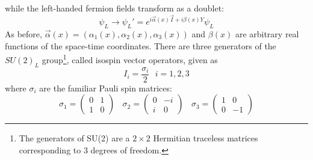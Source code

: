 while the left-handed fermion fields transform as a doublet:
\begin{equation} \label{eq:EW_doublet}
    \psi_L \rightarrow \psi_L' = e^{i\Vec{\alpha}(x)\vec{I} + i\beta(x)Y}\psi_L
\end{equation}
As before, $\Vec{\alpha}(x) = (\alpha_1(x), \alpha_2(x), \alpha_3(x))$ and $\beta(x)$ are arbitrary real functions of the space-time coordinates. There are three generators of the $SU(2)_L$ group\footnote{The generators of SU(2) are a $2 \times 2$ Hermitian traceless matrices corresponding to 3 degrees of freedom.}, called isospin vector operators, given as 
\begin{equation}
    I_i = \frac{\sigma_i}{2} \: \: \: i = 1, 2, 3
\end{equation}
where $\sigma_i$ are the familiar Pauli spin matrices:
\begin{equation}
        \sigma_1 = \begin{pmatrix}
            0 & 1 \\
            1 & 0
        \end{pmatrix} \: \: \: \: \sigma_2 = \begin{pmatrix}
            0 & -i \\
            i & 0
        \end{pmatrix} \: \: \: \: \sigma_3 = \begin{pmatrix}
            1 & 0 \\
            0 & -1
        \end{pmatrix}
\end{equation}

